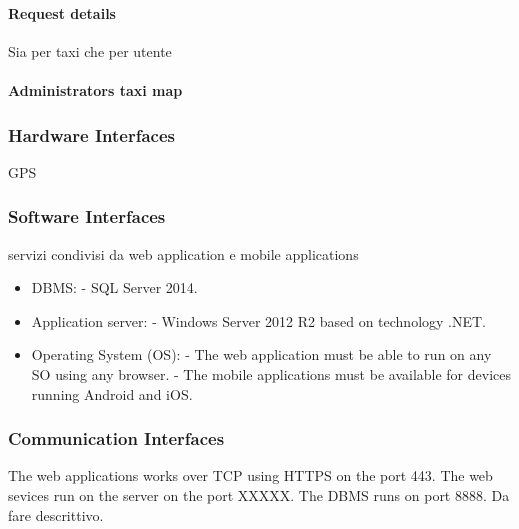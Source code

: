\documentclass{article}
\begin{document}
            \paragraph{Request details} Sia per taxi che per utente
            \paragraph{Administrators taxi map}
            
        \subsubsection{Hardware Interfaces}
            GPS
            
        \subsubsection{Software Interfaces}
            servizi condivisi da web application e mobile applications
            \begin{itemize}
                \item DBMS: \newline
                - SQL Server 2014.
                \item Application server: \newline
                - Windows Server 2012 R2 based on technology .NET.
                \item Operating System (OS): \newline
                - The web application must be able to run on any SO using any browser. \newline
                - The mobile applications must be available for devices running Android and iOS.
            \end{itemize}
            
        \subsubsection{Communication Interfaces}
            The web applications works over TCP using HTTPS on the port 443.\newline
            The web sevices run on the server on the port XXXXX.\newline
            The DBMS runs on port 8888.
            Da fare descrittivo.
            
            
\end{document}
